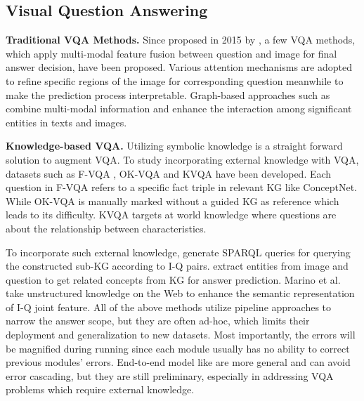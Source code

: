 \documentclass[runningheads]{llncs}
\newcommand{\cjy}[1]{{\color{black}#1}}
\newcommand{\jeff}[1]{{\color{black}#1}}
\begin{document}
\subsection{Visual Question Answering}\label{sec:vqa}
\noindent\textbf{Traditional VQA Methods.} 
\cjy{Since proposed in 2015 by \cite{DBLP:conf/iccv/AntolALMBZP15}, a few VQA methods, which apply multi-modal feature fusion between question and image for final answer decision, have been proposed.}
Various attention mechanisms \cite{DBLP:conf/cvpr/YangHGDS16,DBLP:conf/cvpr/00010BT0GZ18} are adopted to refine specific regions of the image for corresponding question meanwhile \cjy{to} make the prediction process interpretable. Graph-based \cjy{approaches such as} \cite{DBLP:conf/icml/ChenG0LC020} combine multi-modal information and enhance the interaction among significant entities in texts and images. 

\noindent\textbf{Knowledge-based VQA.}  \cjy{Utilizing symbolic knowledge is a straight forward solution to augment VQA.
To study incorporating external knowledge with VQA, datasets such as F-VQA \cite{DBLP:journals/pami/WangWSDH18}, OK-VQA \cite{DBLP:conf/cvpr/MarinoRFM19} and KVQA \cite{DBLP:conf/aaai/ShahMYT19} have been developed}. 
Each question in F-VQA refers to a specific fact triple in relevant KG like ConceptNet.
While OK-VQA is manually marked without a guided KG as reference which leads to its difficulty. 
KVQA targets at world knowledge where questions \jeff{are}   about the relationship between characteristics.

To incorporate such external knowledge, \cite{DBLP:conf/ijcai/WangWSDH17,DBLP:journals/pami/WangWSDH18} generate SPARQL \cjy{queries} for querying the constructed sub-KG according to I-Q pairs. \cite{DBLP:conf/cvpr/WuWSDH16,DBLP:conf/nips/NarasimhanLS18,DBLP:conf/eccv/NarasimhanS18,DBLP:conf/ijcai/ZhuYWS0W20} extract entities \cjy{from} image and question to get related concepts from KG for answer prediction. 
Marino et al.\cite{DBLP:conf/cvpr/MarinoRFM19} take unstructured knowledge on \cjy{the} Web to enhance the semantic representation of I-Q joint feature. 
All of the above 
\cjy{methods utilize} pipeline \cjy{approaches} to narrow the answer scope, but \cjy{they are often ad-hoc, which limits their deployment and generalization to new datasets.}
Most importantly, the errors will be magnified during running since each module usually has no ability to correct previous modules' errors.
End-to-end model like \cite{DBLP:conf/nips/KimJZ18,DBLP:conf/cvpr/00010BT0GZ18} \cjy{are more general and} can avoid error cascading, but they are \cjy{still preliminary, especially in addressing VQA problems} which require external knowledge.
\end{document}
